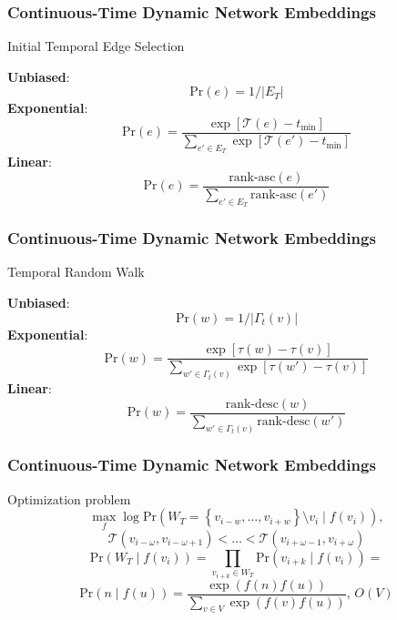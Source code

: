 \documentclass[fleqn, xcolor=x11names]{beamer}
\begin{document}
\begin{frame}\frametitle{Continuous-Time Dynamic Network Embeddings}

\begin{block}{Initial Temporal Edge Selection}

\textbf{Unbiased}:
$$ \text{Pr}(e) = 1/|E_T| $$
\textbf{Exponential}:
$$ \text{Pr}(e) = \frac{\exp\left[\mathcal{T}(e)-t_{\text{min}} \right]}{\sum \limits_{e' \in E_T} 
\exp\left[\mathcal{T}(e')-t_{\text{min}} \right]} $$
\textbf{Linear}:
$$ \text{Pr}(e) = \frac{\text{rank-asc}(e)}{\sum \limits_{e' \in E_T} \text{rank-asc}(e')} $$
\end{block}

\end{frame}

\begin{frame}\frametitle{Continuous-Time Dynamic Network Embeddings}

\begin{block}{Temporal Random Walk}

\textbf{Unbiased}:
$$ \text{Pr}(w) = 1/|\Gamma_t(v)| $$
\textbf{Exponential}:
$$ \text{Pr}(w) = \frac{\exp\left[\tau(w)-\tau(v) \right]}{\sum \limits_{w' \in \Gamma_t(v)} 
\exp\left[\tau(w')-\tau(v) \right]} $$
\textbf{Linear}:
$$ \text{Pr}(w) = \frac{\text{rank-desc}(w)}{\sum \limits_{w' \in \Gamma_t(v)} \text{rank-desc}(w')} $$
\end{block}

\end{frame}

\begin{frame}\frametitle{Continuous-Time Dynamic Network Embeddings}

\begin{block}{Optimization problem}
$$ \max \limits_f \log \text{Pr} \left(
W_T = \left\lbrace v_{i-w}, \dots , v_{i+w} \right\rbrace 
\setminus v_i \mid f(v_i) \right),$$
$$  \mathcal{T} (v_{i-\omega},v_{i-\omega+1}) < \dots < \mathcal{T} (v_{i+\omega-1},v_{i+\omega})$$
$$ \text{Pr} \left(W_T \mid f(v_i) \right)
= \prod \limits_{v_{i+k} \in W_T} \text{Pr} \left(v_{i+k} \mid f(v_i) \right) = 
 $$
 $$\text{Pr} \left(n \mid f(u) \right)  =  \frac{\exp(f(n)f(u))}{\sum \limits_{v \in V} \exp(f(v)f(u))},\, O(V) $$
 

\end{block}

\end{frame}
\end{document}
